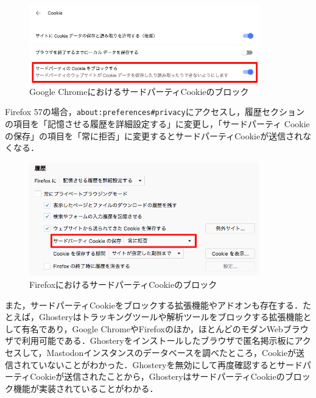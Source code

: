 \documentclass[10pt, a4paper]{jreport}
\begin{document}
\begin{figure}[H]
	\begin{center}
		\includegraphics[width=100mm]{figures/disable_third_party_cookie_on_chrome.png}
	\end{center}
	\caption{Google ChromeにおけるサードパーティCookieのブロック}
	\label{fig: disable_third_party_cookie_on_chrome}
\end{figure}

\noindent
Firefox 57の場合，\verb|about:preferences#privacy|にアクセスし，履歴セクションの項目を「記憶させる履歴を詳細設定する」に変更し，「サードパーティ Cookie の保存」の項目を「常に拒否」に変更するとサードパーティCookieが送信されなくなる\cite{how_to_disable_third_party_cookie_on_firefox}．

\begin{figure}[H]
	\begin{center}
		\includegraphics[width=100mm]{figures/disable_third_party_cookie_on_firefox.png}
	\end{center}
	\caption{FirefoxにおけるサードパーティCookieのブロック}
	\label{fig: disable_third_party_cookie_on_firefox}
\end{figure}

また，サードパーティCookieをブロックする拡張機能やアドオンも存在する．たとえば，Ghosteryはトラッキングツールや解析ツールをブロックする拡張機能として有名であり，Google ChromeやFirefoxのほか，ほとんどのモダンWebブラウザで利用可能である\cite{ghostery}．Ghosteryをインストールしたブラウザで匿名掲示板にアクセスして，Mastodonインスタンスのデータベースを調べたところ，Cookieが送信されていないことがわかった．Ghosteryを無効にして再度確認するとサードパーティCookieが送信されたことから，GhosteryはサードパーティCookieのブロック機能が実装されていることがわかる．
\end{document}
